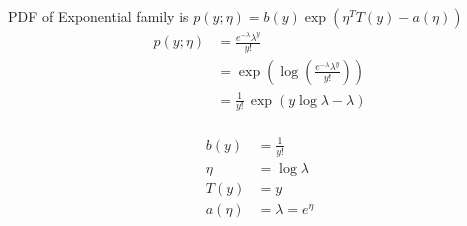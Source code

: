 \begin{answer}
PDF of Exponential family is $p(y;\eta) = b(y)\exp(\eta^T T(y) - a(\eta))$
\begin{align*}
    p(y;\eta) &= \frac{e^{-\lambda}\lambda^y}{y!} \\
    &= \exp\left(\log\left(\frac{e^{-\lambda}\lambda^y}{y!}\right)\right) \\
    &= \frac{1}{y!}\,\exp(y\log{\lambda}-\lambda) \\
\end{align*}

\begin{align*}
    b(y) &= \frac{1}{y!} \\
    \eta &= \log{\lambda} \\
    T(y) &= y \\
    a(\eta) &= \lambda = e^\eta \\
\end{align*}

\end{answer}
